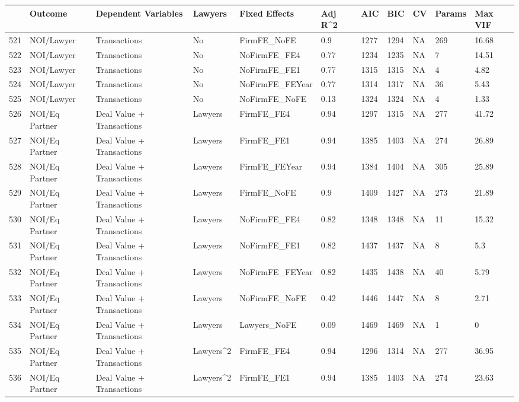 \documentclass{article}
\begin{document}
\begin{table}[H]
\centering
\begin{tabular}{rllllllllll}
  \hline
 & Outcome & Dependent Variables & Lawyers & Fixed Effects & Adj R^2 & AIC & BIC & CV & Params & Max VIF \\ 
  \hline
521 & NOI/Lawyer & Transactions & No & FirmFE\_NoFE & 0.9 & 1277 & 1294 & NA & 269 & 16.68 \\ 
  522 & NOI/Lawyer & Transactions & No & NoFirmFE\_FE4 & 0.77 & 1234 & 1235 & NA & 7 & 14.51 \\ 
  523 & NOI/Lawyer & Transactions & No & NoFirmFE\_FE1 & 0.77 & 1315 & 1315 & NA & 4 & 4.82 \\ 
  524 & NOI/Lawyer & Transactions & No & NoFirmFE\_FEYear & 0.77 & 1314 & 1317 & NA & 36 & 5.43 \\ 
  525 & NOI/Lawyer & Transactions & No & NoFirmFE\_NoFE & 0.13 & 1324 & 1324 & NA & 4 & 1.33 \\ 
  526 & NOI/Eq Partner & Deal Value + Transactions & Lawyers & FirmFE\_FE4 & 0.94 & 1297 & 1315 & NA & 277 & 41.72 \\ 
  527 & NOI/Eq Partner & Deal Value + Transactions & Lawyers & FirmFE\_FE1 & 0.94 & 1385 & 1403 & NA & 274 & 26.89 \\ 
  528 & NOI/Eq Partner & Deal Value + Transactions & Lawyers & FirmFE\_FEYear & 0.94 & 1384 & 1404 & NA & 305 & 25.89 \\ 
  529 & NOI/Eq Partner & Deal Value + Transactions & Lawyers & FirmFE\_NoFE & 0.9 & 1409 & 1427 & NA & 273 & 21.89 \\ 
  530 & NOI/Eq Partner & Deal Value + Transactions & Lawyers & NoFirmFE\_FE4 & 0.82 & 1348 & 1348 & NA & 11 & 15.32 \\ 
  531 & NOI/Eq Partner & Deal Value + Transactions & Lawyers & NoFirmFE\_FE1 & 0.82 & 1437 & 1437 & NA & 8 & 5.3 \\ 
  532 & NOI/Eq Partner & Deal Value + Transactions & Lawyers & NoFirmFE\_FEYear & 0.82 & 1435 & 1438 & NA & 40 & 5.79 \\ 
  533 & NOI/Eq Partner & Deal Value + Transactions & Lawyers & NoFirmFE\_NoFE & 0.42 & 1446 & 1447 & NA & 8 & 2.71 \\ 
  534 & NOI/Eq Partner & Deal Value + Transactions & Lawyers & Lawyers\_NoFE & 0.09 & 1469 & 1469 & NA & 1 & 0 \\ 
  535 & NOI/Eq Partner & Deal Value + Transactions & Lawyers^2 & FirmFE\_FE4 & 0.94 & 1296 & 1314 & NA & 277 & 36.95 \\ 
  536 & NOI/Eq Partner & Deal Value + Transactions & Lawyers^2 & FirmFE\_FE1 & 0.94 & 1385 & 1403 & NA & 274 & 23.63 \\ 

\end{tabular}
\end{table}
\end{document}
